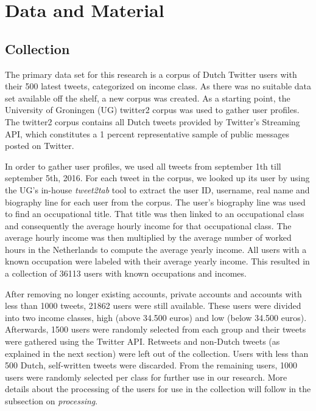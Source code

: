 \documentclass[
10pt, %
a4paper, %
oneside, %
headinclude,footinclude, %
] {book}%
\begin{document}

\chapter{Data and Material}
\section{Collection} 
The primary data set for this research is a corpus of Dutch Twitter users with their 500 latest tweets, categorized on income class. As there was no suitable data set available off the shelf, a new corpus was created. As a starting point, the University of Groningen (UG) twitter2 corpus was used to gather user profiles. The twitter2 corpus contains all Dutch tweets provided by Twitter's Streaming API, which constitutes a 1 percent representative sample of public messages posted on Twitter. 

In order to gather user profiles, we used all tweets from september 1th till september 5th, 2016. For each tweet in the corpus, we looked up its user by using the UG's in-house \textit{tweet2tab} tool to extract the user ID, username, real name and biography line for each user from the corpus. The user's biography line was used to find an occupational title. That title was then linked to an occupational class and consequently the average hourly income for that occupational class. The average hourly income was then multiplied by the average number of worked hours in the Netherlands to compute the average yearly income. All users with a known occupation were labeled with their average yearly income. This resulted in a collection of 36113 users with known occupations and incomes.

After removing no longer existing accounts, private accounts and accounts with less than 1000 tweets, 21862 users were still available. These users were divided into two income classes, high (above 34.500 euros) and low (below 34.500 euros). Afterwards, 1500 users were randomly selected from each group and their tweets were gathered using the Twitter API. Retweets and non-Dutch tweets (as explained in the next section) were left out of the collection. Users with less than 500 Dutch, self-written tweets were discarded. From the remaining users, 1000 users were randomly selected per class for further use in our research. More details about the processing of the users for use in the collection will follow in the subsection on \textit{processing}.
\end{document}
